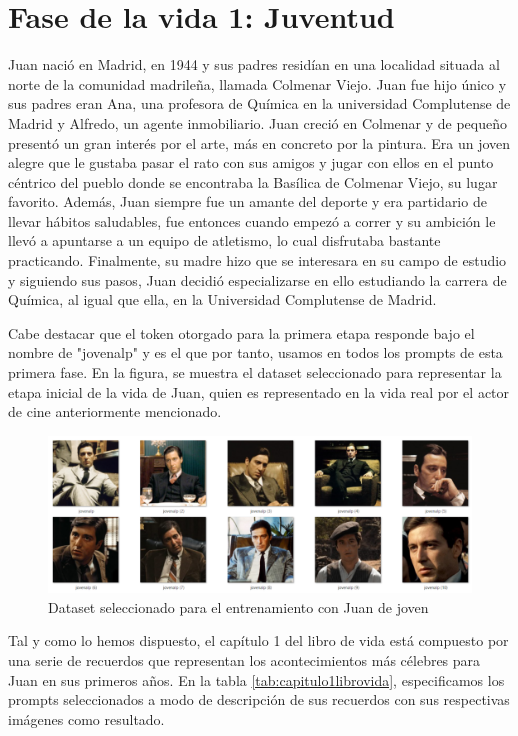\section{Fase de la vida 1: Juventud}

Juan nació en Madrid, en 1944 y sus padres residían en una localidad situada al norte de la comunidad madrileña, llamada Colmenar Viejo. Juan fue hijo único y sus padres eran Ana, una profesora de Química en la universidad Complutense de Madrid y Alfredo, un agente inmobiliario. Juan creció en Colmenar y de pequeño presentó un gran interés por el arte, más en concreto por la pintura. Era un joven alegre que le gustaba pasar el rato con sus amigos y jugar con ellos en el punto céntrico del pueblo donde se encontraba la Basílica de Colmenar Viejo, su lugar favorito. Además, Juan siempre fue un amante del deporte y era partidario de llevar hábitos saludables, fue entonces cuando empezó a correr y su ambición le llevó a apuntarse a un equipo de atletismo, lo cual disfrutaba bastante practicando. Finalmente, su madre hizo que se interesara en su campo de estudio y siguiendo sus pasos, Juan decidió especializarse en ello estudiando la carrera de Química, al igual que ella, en la Universidad Complutense de Madrid. 

Cabe destacar que el token otorgado para la primera etapa responde bajo el nombre de "jovenalp" y es el que por tanto, usamos en todos los prompts de esta primera fase. En la figura, se muestra el dataset seleccionado para representar la etapa inicial de la vida de Juan, quien es representado en la vida real por el actor de cine anteriormente mencionado. 

\begin{figure}[!htb]
	\centering
	\includegraphics[width = 1
	\textwidth]{Imagenes/Vectorial/dataset_jovenalp.png}
	\caption{Dataset seleccionado para el entrenamiento con Juan de joven}
	\label{fig:datasetjovenalp}
\end{figure}

Tal y como lo hemos dispuesto, el capítulo 1 del libro de vida está compuesto por una serie de recuerdos que representan los acontecimientos más célebres para Juan en sus primeros años. En la tabla \ref*{tab:capitulo1librovida}, especificamos los prompts seleccionados a modo de descripción de sus recuerdos con sus respectivas imágenes como resultado. \\
 
